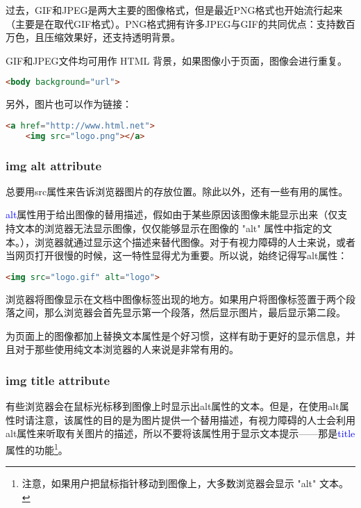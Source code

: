 过去，GIF和JPEG是两大主要的图像格式，但是最近PNG格式也开始流行起来（主要是在取代GIF格式）。PNG格式拥有许多JPEG与GIF的共同优点：支持数百万色，且压缩效果好，还支持透明背景。

GIF和JPEG文件均可用作 HTML 背景，如果图像小于页面，图像会进行重复。

\begin{lstlisting}[language=HTML]
	<body background="url">
\end{lstlisting}


另外，图片也可以作为链接：

\begin{lstlisting}[language=HTML]
	<a href="http://www.html.net">
	<img src="logo.png"></a>
\end{lstlisting}

\subsubsection{img alt attribute}

总要用src属性来告诉浏览器图片的存放位置。除此以外，还有一些有用的属性。

\textcolor{Blue}{alt}属性用于给出图像的替用描述，假如由于某些原因该图像未能显示出来（仅支持文本的浏览器无法显示图像，仅仅能够显示在图像的 "alt" 属性中指定的文本。），浏览器就通过显示这个描述来替代图像。对于有视力障碍的人士来说，或者当网页打开很慢的时候，这一特性显得尤为重要。所以说，始终记得写alt属性：

\begin{lstlisting}[language=HTML]
	<img src="logo.gif" alt="logo">
\end{lstlisting}

浏览器将图像显示在文档中图像标签出现的地方。如果用户将图像标签置于两个段落之间，那么浏览器会首先显示第一个段落，然后显示图片，最后显示第二段。

为页面上的图像都加上替换文本属性是个好习惯，这样有助于更好的显示信息，并且对于那些使用纯文本浏览器的人来说是非常有用的。

\subsubsection{img title attribute}


有些浏览器会在鼠标光标移到图像上时显示出alt属性的文本。但是，在使用alt属性时请注意，该属性的目的是为图片提供一个替用描述，有视力障碍的人士会利用alt属性来听取有关图片的描述，所以不要将该属性用于显示文本提示——那是\textcolor{Blue}{title}属性的功能\footnote{注意，如果用户把鼠标指针移动到图像上，大多数浏览器会显示 "alt" 文本。}。

